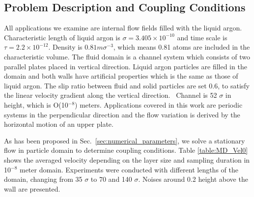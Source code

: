 \documentclass[preprint,12pt]{elsarticle}
\begin{document}
\subsection{Problem Description and Coupling Conditions}
\label{sec:accuracy_conditions}

All applications we examine are internal flow fields filled with the liquid argon. Characteristic length of liquid argon is ${\sigma}=3.405{\times}10^{-10}$ and time scale is $\tau=2.2{\times}10^{-12}$. Density is $0.81m{\sigma}^{-3}$, which means 0.81 atoms are included in the characteristic volume.
The fluid domain is a channel system which consists of two parallel plates placed in vertical direction. Liquid argon particles are filled in the domain and both walls have artificial properties which is the same as those of liquid argon. The slip ratio between fluid and solid particles are set 0.6, to satisfy the linear velocity gradient along the vertical direction.~\cite{Nie}
Channel is 52 $\sigma$ in height, which is O(10$^{-8}$) meters. Applications covered in this work are periodic systems in the perpendicular direction and the flow variation is derived by the horizontal motion of an upper plate.


As has been proposed in Sec.~\ref{sec:numerical_parameters}, we solve a stationary flow in particle domain to determine coupling conditions. Table \ref{table:MD_Vel0} shows the averaged velocity depending on the layer size and sampling duration in 10$^{-8}$ meter domain. Experiments were conducted with different lengths of the domain, changing from 35 $\sigma$ to 70 and 140 $\sigma$. Noises around 0.2 height above the wall are presented. 
\end{document}
